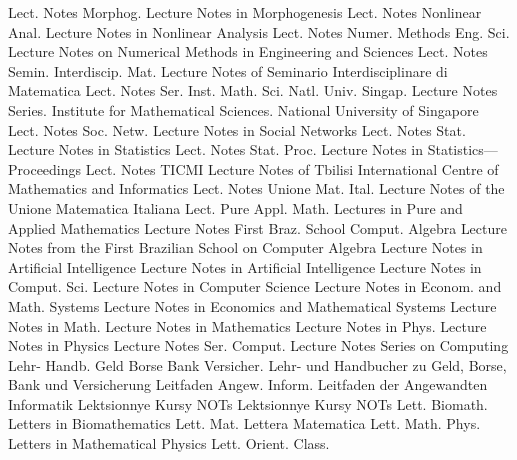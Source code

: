 {Lect. Notes Morphog.}
{Lecture Notes in Morphogenesis}
{Lect. Notes Nonlinear Anal.}
{Lecture Notes in Nonlinear Analysis}
{Lect. Notes Numer. Methods Eng. Sci.}
{Lecture Notes on Numerical Methods in Engineering and Sciences}
{Lect. Notes Semin. Interdiscip. Mat.}
{Lecture Notes of Seminario Interdisciplinare di Matematica}
{Lect. Notes Ser. Inst. Math. Sci. Natl. Univ. Singap.}
{Lecture Notes Series. Institute for Mathematical Sciences. National University of Singapore}
{Lect. Notes Soc. Netw.}
{Lecture Notes in Social Networks}
{Lect. Notes Stat.}
{Lecture Notes in Statistics}
{Lect. Notes Stat. Proc.}
{Lecture Notes in Statistics---Proceedings}
{Lect. Notes TICMI}
{Lecture Notes of Tbilisi International Centre of Mathematics and Informatics}
{Lect. Notes Unione Mat. Ital.}
{Lecture Notes of the Unione Matematica Italiana}
{Lect. Pure Appl. Math.}
{Lectures in Pure and Applied Mathematics}
{Lecture Notes First Braz. School Comput. Algebra}
{Lecture Notes from the First Brazilian School on Computer Algebra}
{Lecture Notes in Artificial Intelligence}
{Lecture Notes in Artificial Intelligence}
{Lecture Notes in Comput. Sci.}
{Lecture Notes in Computer Science}
{Lecture Notes in Econom. and Math. Systems}
{Lecture Notes in Economics and Mathematical Systems}
{Lecture Notes in Math.}
{Lecture Notes in Mathematics}
{Lecture Notes in Phys.}
{Lecture Notes in Physics}
{Lecture Notes Ser. Comput.}
{Lecture Notes Series on Computing}
{Lehr- Handb. Geld Borse Bank Versicher.}
{Lehr- und Handbucher zu Geld, Borse, Bank und Versicherung}
{Leitfaden Angew. Inform.}
{Leitfaden der Angewandten Informatik}
{Lektsionnye Kursy NOTs}
{Lektsionnye Kursy NOTs}
{Lett. Biomath.}
{Letters in Biomathematics}
{Lett. Mat.}
{Lettera Matematica}
{Lett. Math. Phys.}
{Letters in Mathematical Physics}
{Lett. Orient. Class.}
